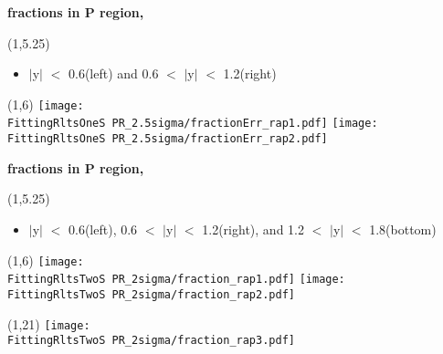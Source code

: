 \documentclass[11pt,slidescentered,red,compress,handout,hyperref={bookmarks=true},mathseriftable]{beamer}
\newcommand{\FittingRltsOneS}{../Psi1S/Fit/parameter/evaluateCtau/}
\newcommand{\FittingRltsTwoS}{../Psi2S/Fit/parameter/evaluateCtau/}
\begin{document}
\begin{frame}[t]{\small \bf fractions in P region,  }{}
\begin{textblock}{48}(1,5.25)
\begin{itemize}
\scriptsize \item  $|$y$|$ $<$ 0.6(left) and 0.6 $<$ $|$y$|$ $<$ 1.2(right)
\end{itemize}
\end{textblock}
\begin{textblock}{48}(1,6)
\hspace*{10pt} \texttt{[image: \\FittingRltsOneS PR\_2.5sigma/fractionErr\_rap1.pdf]}
\hspace*{10pt} \texttt{[image: \\FittingRltsOneS PR\_2.5sigma/fractionErr\_rap2.pdf]}
\end{textblock}
\end{frame}

\begin{frame}[t]{\small \bf fractions in P region,  }{}
\begin{textblock}{48}(1,5.25)
\begin{itemize}
\scriptsize \item  $|$y$|$ $<$ 0.6(left), 0.6 $<$ $|$y$|$ $<$ 1.2(right), and 1.2 $<$ $|$y$|$ $<$ 1.8(bottom)
\end{itemize}
\end{textblock}
\begin{textblock}{48}(1,6)
\hspace*{10pt} \texttt{[image: \\FittingRltsTwoS PR\_2sigma/fraction\_rap1.pdf]}
\hspace*{10pt} \texttt{[image: \\FittingRltsTwoS PR\_2sigma/fraction\_rap2.pdf]}
\begin{textblock}{48}(1,21)
\hspace*{10pt} \texttt{[image: \\FittingRltsTwoS PR\_2sigma/fraction\_rap3.pdf]}
\end{textblock}
\end{textblock}
\end{frame}
\end{document}
